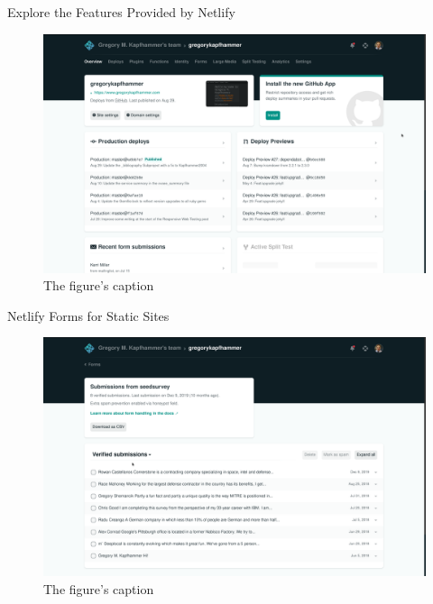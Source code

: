 \documentclass[14pt,aspectratio=169]{beamer}
\begin{document}
%
\begin{frame}{Explore the Features Provided by Netlify}
  \begin{figure}
    \centering
    \includegraphics[scale=.08]{images/netlifydashboard.png}
    \caption{The figure's caption}
  \end{figure}
\end{frame}

%
\begin{frame}{Netlify Forms for Static Sites}
  \begin{figure}
    \centering
    \includegraphics[scale=.08]{images/netlifyformsgreg.png}
    \caption{The figure's caption}
  \end{figure}
\end{frame}
\end{document}
